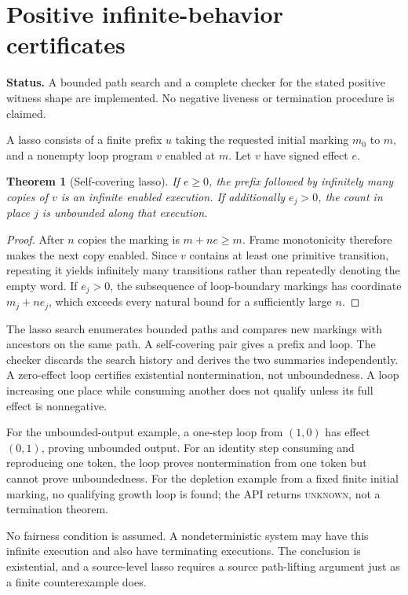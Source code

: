 \documentclass[11pt,a4paper]{article}
\newcommand{\unknown}{\textsc{unknown}}
\newcommand{\status}[1]{\par\noindent\textbf{Status.} #1\par}
\newtheorem{theorem}{Theorem}[section]
\theoremstyle{definition}
\theoremstyle{remark}
\begin{document}
\section{Positive infinite-behavior certificates}\label{sec:lasso}
\status{A bounded path search and a complete checker for the stated positive witness shape are implemented. No negative liveness or termination procedure is claimed.}
A lasso consists of a finite prefix $u$ taking the requested initial marking $m_0$ to $m$, and a nonempty loop program $v$ enabled at $m$. Let $v$ have signed effect $e$.

\begin{theorem}[Self-covering lasso]\label{thm:lasso}
If $e\ge0$, the prefix followed by infinitely many copies of $v$ is an infinite enabled execution. If additionally $e_j>0$, the count in place $j$ is unbounded along that execution.
\end{theorem}
\begin{proof}
After $n$ copies the marking is $m+ne\ge m$. Frame monotonicity therefore makes the next copy enabled. Since $v$ contains at least one primitive transition, repeating it yields infinitely many transitions rather than repeatedly denoting the empty word. If $e_j>0$, the subsequence of loop-boundary markings has coordinate $m_j+ne_j$, which exceeds every natural bound for a sufficiently large $n$.
\end{proof}

The lasso search enumerates bounded paths and compares new markings with ancestors on the same path. A self-covering pair gives a prefix and loop. The checker discards the search history and derives the two summaries independently. A zero-effect loop certifies existential nontermination, not unboundedness. A loop increasing one place while consuming another does not qualify unless its full effect is nonnegative.

For the unbounded-output example, a one-step loop from $(1,0)$ has effect $(0,1)$, proving unbounded output. For an identity step consuming and reproducing one token, the loop proves nontermination from one token but cannot prove unboundedness. For the depletion example from a fixed finite initial marking, no qualifying growth loop is found; the API returns \unknown{}, not a termination theorem.

No fairness condition is assumed. A nondeterministic system may have this infinite execution and also have terminating executions. The conclusion is existential, and a source-level lasso requires a source path-lifting argument just as a finite counterexample does.
\end{document}
